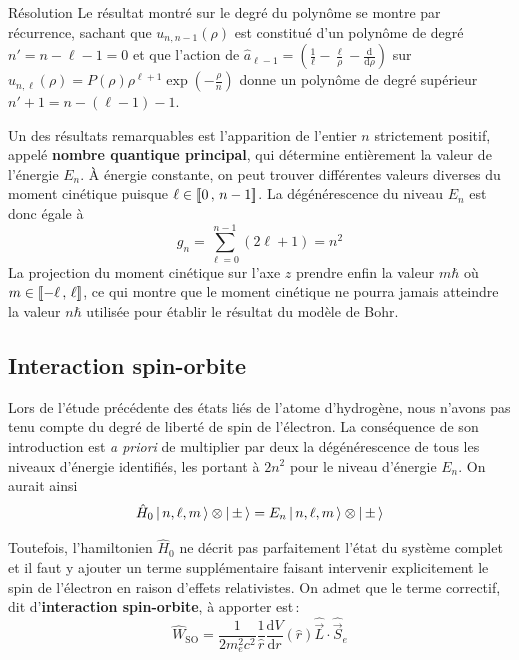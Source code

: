 \begin{demo}{Résolution}
            Le résultat montré sur le degré du polynôme se montre par récurrence, sachant que $u_{n, n-1}(\rho)$ est constitué d’un polynôme de degré $n' = n - \ell - 1 = 0$ et que l’action de $\hat{a}_{\ell - 1} = \left(\frac{1}{\ell} - \frac{\ell}{\rho} - \frac{\text{d}}{\text{d}\rho} \right)$ sur $u_{n,\ell}(\rho) = P(\rho) \rho^{\ell + 1} \exp\left(-\frac{\rho}{n}\right)$ donne un polynôme de degré supérieur $n' + 1 = n - (\ell - 1) - 1$.
        \end{demo}

        Un des résultats remarquables est l’apparition de l’entier $n$ strictement positif, appelé \textbf{nombre quantique principal}, qui détermine entièrement la valeur de l’énergie $E_n$. À énergie constante, on peut trouver différentes valeurs diverses du moment cinétique puisque $\ell \in \left[\!\left[ 0 \, , \, n-1 \right]\!\right]$. La dégénérescence du niveau $E_n$ est donc égale à 
        \[ g_n = \sum_{\ell = 0}^{n-1} \left(2\ell + 1\right) = n^2 \]   
        La projection du moment cinétique sur l’axe $z$ prendre enfin la valeur $m \hbar$ où $m \in \left[\!\left[ -\ell \, , \, \ell \right]\!\right]$, ce qui montre que le moment cinétique ne pourra jamais atteindre la valeur $n\hbar$ utilisée pour établir le résultat du modèle de Bohr. 

    \subsection{Interaction spin-orbite}

        Lors de l’étude précédente des états liés de l’atome d’hydrogène, nous n’avons pas tenu compte du degré de liberté de spin de l’électron. La conséquence de son introduction est \textit{a priori} de multiplier par deux la dégénérescence de tous les niveaux d’énergie identifiés, les portant à $2 n^2$ pour le niveau d’énergie $E_n$. On aurait ainsi 
        \[ \hat{H}_0 \left| \, n,\ell,m \, \right> \otimes \left| \, \pm \, \right> = E_n \left| \, n, \ell, m \, \right> \otimes \left| \, \pm \, \right> \] 

        Toutefois, l’hamiltonien $\hat{H}_0$ ne décrit pas parfaitement l’état du système complet et il faut y ajouter un terme supplémentaire faisant intervenir explicitement le spin de l’électron en raison d’effets relativistes. On admet que le terme correctif, dit d’\textbf{interaction spin-orbite}, à apporter est :
        \[ \hat{W}_{\text{SO}} = \frac{1}{2 m_e^2 c^2} \frac{1}{\hat{r}} \frac{\text{d}V}{\text{d}r}(\hat{r}) \hat{\vec{L}} \cdot \hat{\vec{S}}_e \]

